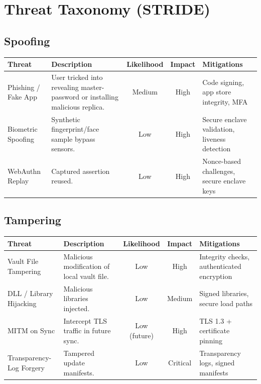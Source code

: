 \section{Threat Taxonomy (STRIDE)}
	
	\subsection{Spoofing}
		\begin{center}
			\begin{tabularx}{\textwidth}{>{\raggedright\arraybackslash}p{3cm} | X | c | c | X}
				\toprule
				\textbf{Threat} & \textbf{Description} & \textbf{Likelihood} & \textbf{Impact} & \textbf{Mitigations} \\
				\midrule
				Phishing / Fake App & User tricked into revealing master-password or installing malicious replica. & Medium & High & Code signing, app store integrity, MFA \\
                \midrule
				Biometric Spoofing & Synthetic fingerprint/face sample bypass sensors. & Low & High & Secure enclave validation, liveness detection \\
                \midrule
				WebAuthn Replay & Captured assertion reused. & Low & High & Nonce-based challenges, secure enclave keys \\
				\bottomrule
			\end{tabularx}
		\end{center}
	
	\subsection{Tampering}
		\begin{center}
			\begin{tabularx}{\textwidth}{>{\raggedright\arraybackslash}p{3cm} | X | c | c | X}
				\toprule
				\textbf{Threat} & \textbf{Description} & \textbf{Likelihood} & \textbf{Impact} & \textbf{Mitigations} \\
				\midrule
				Vault File Tampering & Malicious modification of local vault file. & Low & High & Integrity checks, authenticated encryption \\
                \midrule
				DLL / Library Hijacking & Malicious libraries injected. & Low & Medium & Signed libraries, secure load paths \\
                \midrule
				MITM on Sync & Intercept TLS traffic in future sync. & Low (future) & High & TLS 1.3 + certificate pinning \\
                \midrule
				Transparency-Log Forgery & Tampered update manifests. & Low & Critical & Transparency logs, signed manifests \\
				\bottomrule
			\end{tabularx}
		\end{center}
	
